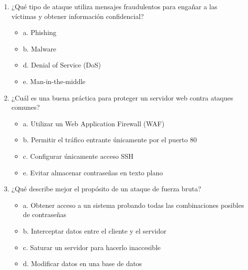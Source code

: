\documentclass[a4paper]{article}
\begin{document}
\begin{enumerate}
    \item ¿Qué tipo de ataque utiliza mensajes fraudulentos para engañar a las víctimas y obtener información confidencial? 
    \begin{itemize}
        \item a. Phishing
        \item b. Malware
        \item d. Denial of Service (DoS)
        \item e. Man-in-the-middle
    \end{itemize}
    
    \item ¿Cuál es una buena práctica para proteger un servidor web contra ataques comunes? 
    \begin{itemize}
        \item a. Utilizar un Web Application Firewall (WAF)
        \item b. Permitir el tráfico entrante únicamente por el puerto 80
        \item c. Configurar únicamente acceso SSH
        \item e. Evitar almacenar contraseñas en texto plano
    \end{itemize}
    
    \item ¿Qué describe mejor el propósito de un ataque de fuerza bruta? 
    \begin{itemize}
        \item a. Obtener acceso a un sistema probando todas las combinaciones posibles de contraseñas
        \item b. Interceptar datos entre el cliente y el servidor
        \item c. Saturar un servidor para hacerlo inaccesible
        \item d. Modificar datos en una base de datos
    \end{itemize}
    

\end{enumerate}
\end{document}
